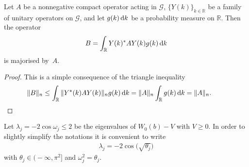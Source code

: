 \begin{Lemma}\label{lem:maj}
Let $A$ be a nonnegative compact operator acting in $\mathcal{G}$, $\{Y(k)\}_{k\in \mathbb R}$ be a family of unitary operators on $\mathcal{G}$, and let $g(k)\, {\rm d} k$ be a probability measure on $\mathbb R$. Then the operator
\begin{gather*}
B = \int_{\mathbb R} Y(k)^* A Y(k) g(k) \, {\rm d} k
\end{gather*}
is majorised by~$A$.
\end{Lemma}

\begin{proof}This is a simple consequence of the triangle inequality
\begin{gather*}
\|B\|_n \le \int_{\mathbb R} \| Y^*(k) A Y(k)\|_n g(k) \, {\rm d} k = \|A\|_n \int_{\mathbb R} g(k) \, {\rm d} k = \|A\|_n.\tag*{\qed}
\end{gather*}
 \renewcommand{\qed}{}
\end{proof}

Let $\lambda_j=-2\cos\omega_j\le 2$ be the eigenvalues of $W_0(b)-V$ with $V\ge0$. In order to slightly simplify the notations it is convenient to write
\begin{gather*}
\lambda_j=-2\cos\big(\sqrt{\theta_j}\big)
\end{gather*}
with $\theta_j\in\big({-}\infty,\pi^2\big]$ and $\omega_j^2=\theta_j$.


